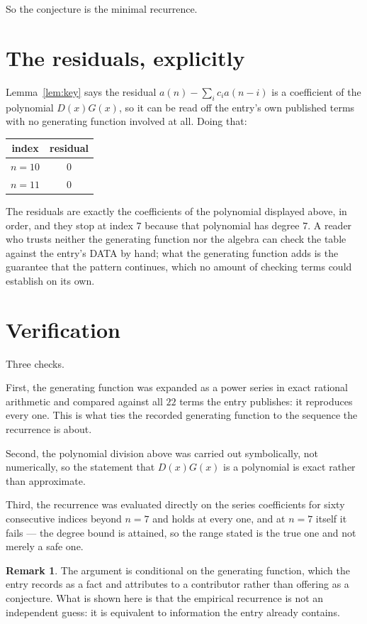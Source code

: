 \documentclass[11pt,a4paper]{article}
\theoremstyle{plain}
\theoremstyle{definition}
\newtheorem{remark}[theorem]{Remark}
\begin{document}
So the conjecture is the minimal recurrence.

\section{The residuals, explicitly}

Lemma~\ref{lem:key} says the residual $a(n)-\sum_ic_ia(n-i)$ is a coefficient of the
polynomial $D(x)G(x)$, so it can be read off the entry's own published terms with no
generating function involved at all. Doing that:
\begin{center}
\begin{tabular}{cc}
index & residual \\ \hline
$n=10$ & $0$ \\
$n=11$ & $0$
\end{tabular}
\end{center}
The residuals are exactly the coefficients of the polynomial displayed above, in order, and
they stop at index $7$ because that polynomial has degree $7$. A reader who trusts
neither the generating function nor the algebra can check the table against the entry's DATA
by hand; what the generating function adds is the guarantee that the pattern continues, which
no amount of checking terms could establish on its own.

\section{Verification}

Three checks.

First, the generating function was expanded as a power series in exact rational arithmetic and
compared against all $22$ terms the entry publishes: it reproduces every one. This is
what ties the recorded generating function to the sequence the recurrence is about.

Second, the polynomial division above was carried out symbolically, not numerically, so the
statement that $D(x)G(x)$ is a polynomial is exact rather than approximate.

Third, the recurrence was evaluated directly on the series coefficients for sixty consecutive
indices beyond $n=7$ and holds at every one, and at $n=7$ itself it fails --- the
degree bound is attained, so the range stated is the true one and not merely a safe one.

\begin{remark}
The argument is conditional on the generating function, which the entry records as a fact and
attributes to a contributor rather than offering as a conjecture. What is shown here is that
the empirical recurrence is not an independent guess: it is equivalent to information the
entry already contains.
\end{remark}
\end{document}
